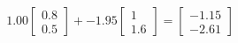 \documentclass[preview]{standalone}
\begin{document}
\begin{align*}
1.00 \begin{bmatrix} 0.8 \\ 0.5 \end{bmatrix} + -1.95 \begin{bmatrix} 1 \\ 1.6 \end{bmatrix} = \begin{bmatrix} -1.15 \\ -2.61 \end{bmatrix}
\end{align*}
\end{document}
